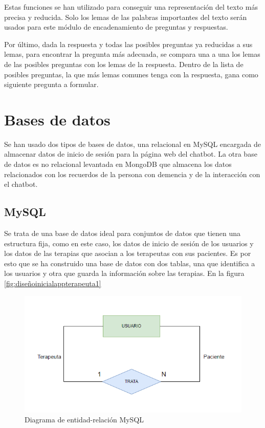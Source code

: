 Estas funciones se han utilizado para conseguir una representación del texto más precisa y reducida. Solo los lemas de las palabras importantes del texto serán usados para este módulo de encadenamiento de preguntas y respuestas.

Por último, dada la respuesta y todas las posibles preguntas ya reducidas a sus lemas, para encontrar la pregunta más adecuada, se compara una a una los lemas de las posibles preguntas con los lemas de la respuesta. Dentro de la lista de posibles preguntas, la que más lemas comunes tenga con la respuesta, gana como siguiente pregunta a formular.


\section{Bases de datos}

Se han usado dos tipos de bases de datos, una relacional en MySQL encargada de almacenar datos de inicio de sesión para la página web del chatbot. La otra base de datos es no relacional levantada en MongoDB que almacena los datos relacionados con los recuerdos de la persona con demencia y de la interacción con el chatbot. 

\subsection{MySQL}

Se trata de una base de datos ideal para conjuntos de datos que tienen una estructura fija, como en este caso, los datos de inicio de sesión de los usuarios y los datos de las terapias que asocian a los terapeutas con sus pacientes. Es por esto que se ha construido una base de datos con dos tablas, una que identifica a los usuarios y otra que guarda la información sobre las terapias. En la figura \ref{fig:diseñoinicialappterapeuta1}

\begin{figure}[h]
	\centering
	\includegraphics[scale=1.0]{Imagenes/Vectorial/diagrama_entidad_relacion_mysql}
	\caption{Diagrama de entidad-relación MySQL}
	\label{fig:diagramaEER}
\end{figure}

